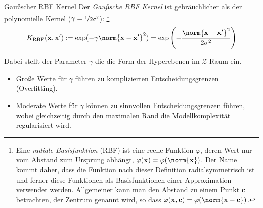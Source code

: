 \begin{defi}{Gaußscher RBF Kernel}
    Der \emph{Gaußsche RBF Kernel} ist gebräuchlicher als der polynomielle Kernel ($\gamma = \nicefrac{1}{2\sigma^2}$):
    \footnote{
        Eine \emph{radiale Basisfunktion} (RBF) ist eine reelle Funktion $\varphi$, deren Wert nur vom Abstand zum Ursprung abhängt,  $\varphi (\mathbf {x} )=\varphi (\norm{\mathbf {x}})$.
        Der Name kommt daher, dass die Funktion nach dieser Definition radialsymmetrisch ist und ferner diese Funktionen als Basisfunktionen einer Approximation verwendet werden.
        Allgemeiner kann man den Abstand zu einem Punkt $\mathbf {c}$ betrachten, der Zentrum genannt wird, so dass $\varphi (\mathbf {x} ,\mathbf {c} )=\varphi (\norm{\mathbf {x} -\mathbf {c}})$.
    }
    \[
        K_\text{RBF}(\mathbf{x}, \mathbf{x}') := \exp(-\gamma \norm{\mathbf{x} - \mathbf{x}'}^2) = \exp \left( - \frac{\norm{\mathbf{x} - \mathbf{x}'}^2}{2\sigma^2} \right)
    \]

    \begin{center}
    \end{center}

    Dabei stellt der Parameter $\gamma$ die die Form der Hyperebenen im $\mathcal{Z}$-Raum ein.
    \begin{itemize}
        \item Große Werte für $\gamma$ führen zu komplizierten Entscheidungsgrenzen (Overfitting).
        \item Moderate Werte für $\gamma$ können zu sinnvollen Entscheidungsgrenzen führen, wobei gleichzeitig durch den maximalen Rand die Modellkomplexität regularisiert wird.
    \end{itemize}
\end{defi}

